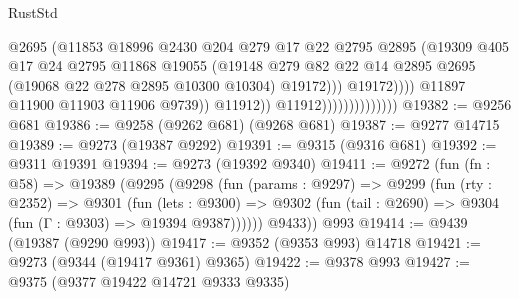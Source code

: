 \begin{lexlean}{RustStd}
\begin{coremodule}
{\begin{coremodule}
{{{{{{{{{{{{{{{{{{{{{{{{{{{{{{{{{{{{{{{{{{{{{{{{{{{{{{{                                                @2695
                                                (@11853
                                                  @18996
                                                  @2430
                                                  @204
                                                  @279
                                                  @17
                                                  @22
                                                  @2795
                                                  @2895
                                                  (@19309
                                                    @405
                                                    @17
                                                    @24
                                                    @2795
                                                    @11868
                                                    @19055
                                                    (@19148
                                                      @279
                                                      @82
                                                      @22
                                                      @14
                                                      @2895
                                                      @2695
                                                      (@19068 @22 @278 @2895 @10300 @10304)
                                                      @19172)))
                                                @19172))))
                                        @11897
                                        @11900
                                        @11903
                                        @11906
                                        @9739))
                                    @11912))
                                @11912))))))))))))))
@19382 := @9256 @681
@19386 := @9258 (@9262 @681) (@9268 @681)
@19387 := @9277 @14715
@19389 := @9273 (@19387 @9292)
@19391 := @9315 (@9316 @681)
@19392 := @9311 @19391
@19394 := @9273 (@19392 @9340)
@19411 := @9272
    (fun (fn : @58) =>
    @19389
      (@9295
        (@9298
          (fun (params : @9297) =>
          @9299
            (fun (rty : @2352) =>
            @9301
              (fun (lets : @9300) =>
              @9302 (fun (tail : @2690) => @9304 (fun (Γ : @9303) => @19394 @9387))))))
        @9433))
    @993
@19414 := @9439 (@19387 (@9290 @993))
@19417 := @9352 (@9353 @993) @14718
@19421 := @9273 (@9344 (@19417 @9361) @9365)
@19422 := @9378 @993
@19427 := @9375 (@9377 @19422 @14721 @9333 @9335)
}}}}}}}}}}}}}}}}}}}}}}}}}}}}}}}}}}}}}}}}}}}}}}}}}}}}}}}
\end{coremodule}}
\end{coremodule}
\end{lexlean}
